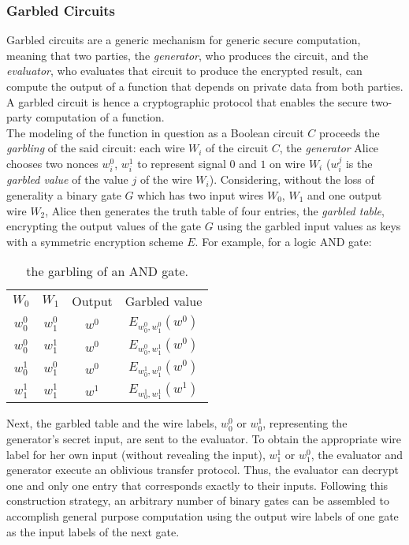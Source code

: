 \begin{refsection}
\subsubsection{Garbled Circuits}
Garbled circuits are a generic mechanism for generic secure computation, meaning that two parties, the \textit{generator}, who produces the circuit, and the \textit{evaluator}, who evaluates that circuit to produce the encrypted result, can compute the output of a function that depends on private data from both parties. A garbled circuit is hence a cryptographic protocol that enables the secure two-party computation of a function.\\
The modeling of the function in question as a Boolean circuit $C$ proceeds the \textit{garbling} of the said circuit: each wire $W_i$ of the circuit $C$, the \textit{generator} Alice chooses two nonces $w_i^0$, $w_i^1$ to represent signal $0$ and $1$ on wire $W_i$ ($w_i^j$ is the \textit{garbled value} of the value $j$ of the wire $W_i$). Considering, without the loss of generality a binary gate $G$ which has two input wires $W_0$, $W_1$ and one output wire $W_2$, Alice then generates the truth table of four entries, the \textit{garbled table}, encrypting the output values of the gate $G$ using the garbled input values as keys with a symmetric encryption scheme $E$. For example, for a logic AND gate:
\begin{table}[htp!]
	\centering
	\caption{the garbling of an AND gate.}
	\begin{tabular}{cccc}
		$W_0$   & $W_1$   & Output & Garbled value                     \\
		$w_0^0$ & $w_1^0$ & $w^0$  & $E_{w_0^0,w_1^0}\left(w^0\right)$ \\
		$w_0^0$ & $w_1^1$ & $w^0$  & $E_{w_0^0,w_1^1}\left(w^0\right)$ \\
		$w_0^1$ & $w_1^0$ & $w^0$  & $E_{w_0^1,w_1^0}\left(w^0\right)$ \\
		$w_1^1$ & $w_1^1$ & $w^1$  & $E_{w_0^1,w_1^1}\left(w^1\right)$
	\end{tabular}
\end{table}
Next, the garbled table and the wire labels, $w_0^0$ or $w_0^1$, representing the generator’s secret input, are sent to the evaluator. To obtain the appropriate wire label for her own input (without revealing the input), $w_1^1$ or $w_1^0$, the evaluator and generator execute an oblivious transfer protocol. Thus, the evaluator can decrypt one and only one entry that corresponds exactly to their inputs. Following this construction strategy, an arbitrary number of binary gates can be assembled to accomplish general purpose computation using the output wire labels of one gate as the input labels of the next gate.

\clearpage
\printbibliography[heading=subbibliography]
\end{refsection}
\cleardoublepage
